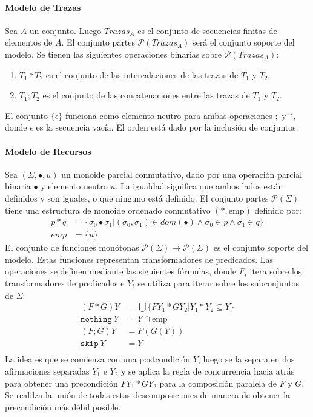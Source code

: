 \paragraph{Modelo de Trazas} Sea $A$ un conjunto. Luego $Trazas_A$ es el conjunto de secuencias finitas de elementos de $A$. El conjunto partes $\mathcal{P}(Trazas_A)$ será el conjunto soporte del modelo. Se tienen las siguientes operaciones binarias sobre $\mathcal{P}(Trazas_A)$:
\begin{enumerate}
	\item $T_1 * T_2$ es el conjunto de las intercalaciones de las trazas de $T_1$ y $T_2$.
	\item $T_1 ; T_2$ es el conjunto de las concatenaciones entre las trazas de $T_1$ y $T_2$.
\end{enumerate}
El conjunto $\{\epsilon\}$ funciona como elemento neutro para ambas operaciones $;$ y $*$, donde $\epsilon$ es la secuencia vacía. El orden está dado por la inclusión de conjuntos. 

\paragraph{Modelo de Recursos} Sea $(\Sigma,\bullet,u)$ un monoide parcial conmutativo, dado por una operación parcial binaria $\bullet$ y elemento neutro $u$. La igualdad significa que ambos lados están definidos y son iguales, o que ninguno está definido. El conjunto partes $\mathcal{P}(\Sigma)$ tiene una estructura de monoide ordenado conmutativo $(*,\text{emp})$ definido por:
\begin{align*}
p * q &= \{\sigma_0 \bullet \sigma_1 | (\sigma_0, \sigma_1) \in dom(\bullet) \land \sigma_0 \in p \land \sigma_1 \in q\} \\
emp &= \{u\}
\end{align*}
El conjunto de funciones monótonas $\mathcal{P}(\Sigma) \rightarrow \mathcal{P}(\Sigma)$ es el conjunto soporte del modelo. Estas funciones representan transformadores de predicados. Las operaciones se definen mediante las siguientes fórmulas, donde $F_i$ itera sobre los transformadores de predicados e $Y_i$ se utiliza para iterar sobre los subconjuntos de $\Sigma$:
\begin{align*}
(F * G) Y &= \bigcup \{FY_1 * GY_2 | Y_1 * Y_2 \subseteq Y\} \\
\mathtt{nothing} \ Y &= Y \cap \text{emp}  \\
(F ; G) Y &= F(G(Y))  \\
\mathtt{skip} \ Y &= Y \\
\end{align*}
La idea es que se comienza con una postcondición $Y$, luego se la separa en dos afirmaciones separadas $Y_1$ e $Y_2$ y se aplica la regla de concurrencia hacia atrás para obtener una precondición $FY_1 * GY_2$ para la composición paralela de $F$ y $G$. Se realilza la unión de todas estas descomposiciones de manera de obtener la precondición más débil posible. 

